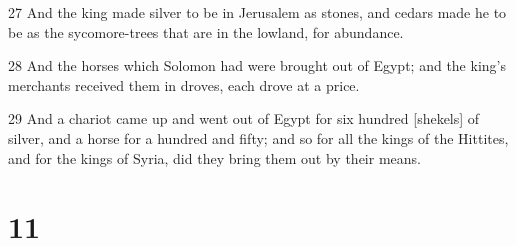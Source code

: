 \par 27 And the king made silver to be in Jerusalem as stones, and cedars made he to be as the sycomore-trees that are in the lowland, for abundance.
\par 28 And the horses which Solomon had were brought out of Egypt; and the king's merchants received them in droves, each drove at a price.
\par 29 And a chariot came up and went out of Egypt for six hundred [shekels] of silver, and a horse for a hundred and fifty; and so for all the kings of the Hittites, and for the kings of Syria, did they bring them out by their means.

\chapter{11}

